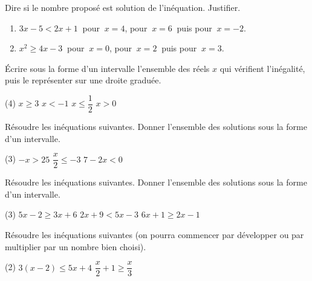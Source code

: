 \documentclass[a4paper,11pt,fleqn]{article}
\begin{document}

\begin{EXO}{}{}
Dire si le nombre proposé est solution de l'inéquation. Justifier.

\begin{enumerate}[itemsep=1em]
	\item $3x-5<2x+1~$ pour $~x=4$, pour $~x=6~$ puis pour $~x=-2$.
	\item $x^2\geqslant 4x-3~$ pour $~x=0$, pour $~x=2~$ puis pour $~x=3$.
\end{enumerate}
\end{EXO}
\vfill
\begin{EXO}{}{}
Écrire sous la forme d'un intervalle l'ensemble des réels $x$ qui vérifient l'inégalité, puis le représenter sur une droite graduée.

\begin{tasks}[after-item-skip=1em](4)
	\task $x\geqslant 3$
	\task $x<-1$
	\task $x\leqslant \dfrac{1}{2}$
	\task $x>0$
\end{tasks}
\end{EXO}
\vfill
\begin{EXO}{}{}
Résoudre les inéquations suivantes. Donner l'ensemble des solutions sous la forme d'un intervalle.

\begin{tasks}[after-item-skip=1em](3)
	\task $-x>25$
	\task $\dfrac{x}{2}\leqslant -3$
	\task $7-2x<0$
\end{tasks}
\end{EXO}
\vfill
\begin{EXO}{}{}
Résoudre les inéquations suivantes. Donner l'ensemble des solutions sous la forme d'un intervalle.

\begin{tasks}[after-item-skip=1em](3)
	\task $5x-2\geqslant 3x+6$
	\task $2x+9<5x-3$
	\task $6x+1\geqslant 2x-1$
\end{tasks}
\end{EXO}
\vfill
\begin{EXO}{}{}
Résoudre les inéquations suivantes (on pourra commencer par développer ou par multiplier par un nombre bien choisi).

\begin{tasks}[after-item-skip=1em](2)
	\task $3(x-2)\leqslant 5x+4$
	\task $\dfrac{x}{2}+1\geqslant \dfrac{x}{3}$
\end{tasks}
\end{EXO}
\vfill
\clearpage

\ifdefined\ELEVE\else
\clearpage
{}
\end{document}
